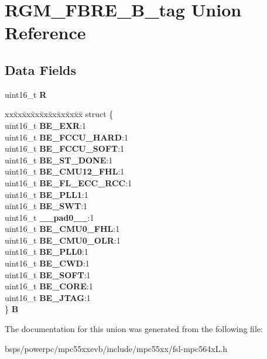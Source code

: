 \hypertarget{unionRGM__FBRE__16B__tag}{}\section{R\+G\+M\+\_\+\+F\+B\+R\+E\+\_\+B\+\_\+tag Union Reference}
\label{unionRGM__FBRE__16B__tag}
\subsection*{Data Fields}
\begin{DoxyCompactItemize}
\item 
\mbox{\label{unionRGM__FBRE__16B__tag_a451d7b76d4e438e24f2444fd42153fca}} 
uint16\+\_\+t {\bfseries R}
\item 
\mbox{\label{unionRGM__FBRE__16B__tag_a45d7b94b4138b1bf2be8e6e1d0eac948}} 
\begin{tabbing}
xx\=xx\=xx\=xx\=xx\=xx\=xx\=xx\=xx\=\kill
struct \{\\
\>uint16\_t {\bfseries BE\_EXR}:1\\
\>uint16\_t {\bfseries BE\_FCCU\_HARD}:1\\
\>uint16\_t {\bfseries BE\_FCCU\_SOFT}:1\\
\>uint16\_t {\bfseries BE\_ST\_DONE}:1\\
\>uint16\_t {\bfseries BE\_CMU12\_FHL}:1\\
\>uint16\_t {\bfseries BE\_FL\_ECC\_RCC}:1\\
\>uint16\_t {\bfseries BE\_PLL1}:1\\
\>uint16\_t {\bfseries BE\_SWT}:1\\
\>uint16\_t {\bfseries \_\_pad0\_\_}:1\\
\>uint16\_t {\bfseries BE\_CMU0\_FHL}:1\\
\>uint16\_t {\bfseries BE\_CMU0\_OLR}:1\\
\>uint16\_t {\bfseries BE\_PLL0}:1\\
\>uint16\_t {\bfseries BE\_CWD}:1\\
\>uint16\_t {\bfseries BE\_SOFT}:1\\
\>uint16\_t {\bfseries BE\_CORE}:1\\
\>uint16\_t {\bfseries BE\_JTAG}:1\\
\} {\bfseries B}\\

\end{tabbing}\end{DoxyCompactItemize}


The documentation for this union was generated from the following file\+:\begin{DoxyCompactItemize}
\item 
bsps/powerpc/mpc55xxevb/include/mpc55xx/fsl-\/mpc564x\+L.\+h\end{DoxyCompactItemize}
